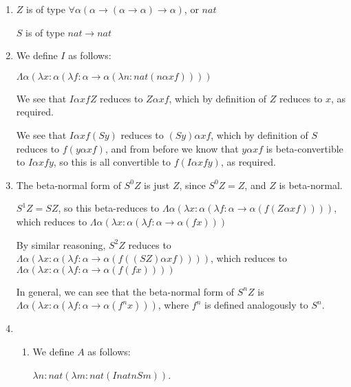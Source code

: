 


\begin{enumerate}[label=(\alph*)]
    \item

        $Z$ is of type $\forall \alpha (\alpha \rightarrow (\alpha \rightarrow \alpha) \rightarrow \alpha)$, or $nat$

        $S$ is of type $nat \rightarrow nat$

    \item
        We define $I$ as follows:

        $\Lambda \alpha(\lambda x : \alpha (\lambda f: \alpha \rightarrow \alpha (\lambda n : nat (n \alpha x f))))$

        We see that $I \alpha x f Z$ reduces to $Z \alpha x f$, which by definition of $Z$ reduces to $x$, as required.

        We see that $I \alpha x f (S y)$ reduces to $(S y) \alpha x f$, which by definition of $S$ reduces to $f (y \alpha x f)$, and from before we know that $y \alpha x f$ is beta-convertible to $I \alpha x f y$, so this is all convertible to $f (I \alpha x f y)$, as required.

    \item
        The beta-normal form of $S^0 Z$ is just $Z$, since $S^0 Z = Z$, and $Z$ is beta-normal.

        $S^1 Z = S Z$, so this beta-reduces to $\Lambda \alpha(\lambda x : \alpha (\lambda f : \alpha \rightarrow \alpha (f (Z \alpha x f))))$, which reduces to  $\Lambda \alpha (\lambda x : \alpha (\lambda f : \alpha \rightarrow \alpha (f x)))$

        By similar reasoning, $S^2 Z$ reduces to $\Lambda \alpha(\lambda x : \alpha (\lambda f : \alpha \rightarrow \alpha (f ((S Z) \alpha x f))))$, which reduces to $\Lambda \alpha(\lambda x : \alpha (\lambda f : \alpha \rightarrow \alpha (f (f x))))$

        In general, we can see that the beta-normal form of $S^n Z$ is $\Lambda \alpha (\lambda x : \alpha (\lambda f : \alpha \rightarrow \alpha (f^n x)))$, where $f^n$ is defined analogously to $S^n$.

    \item
        \begin{enumerate}[label=(\roman*)]
            \item
                We define $A$ as follows:

                $\lambda n : nat (\lambda m : nat (I nat n S m))$.


\end{enumerate}
\end{enumerate}
